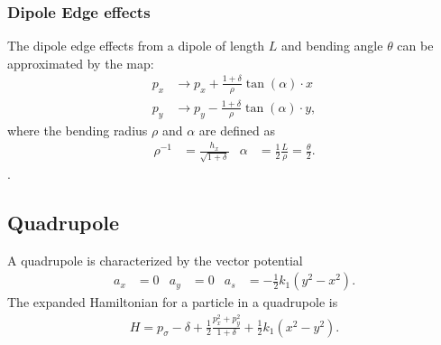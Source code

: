 \documentclass[english]{article}
\begin{document}
\subsubsection{Dipole Edge effects}
The dipole edge effects from a dipole of length $L$ and bending
angle $\theta$ can be approximated by the map:
\begin{align}
    p_x &\to p_x + \frac{1+\delta}{\rho} \tan(\alpha) \cdot x \\
    p_y &\to p_y - \frac{1+\delta}{\rho} \tan(\alpha) \cdot y,
\end{align}
where the bending radius $\rho$ and $\alpha$ are defined as
\begin{align}
    \rho^{-1}   &= \frac{h_x}{\sqrt{1+\delta}} &
    \alpha &= \frac{1}{2} \frac{L}{\rho} = \frac{\theta}{2}.
\end{align}.


\subsection{Quadrupole}

A quadrupole is characterized by the vector potential
\begin{align}
  a_x & = 0  & a_y & = 0 & a_s & = -\frac{1}{2}k_1(y^2 - x^2).
\end{align}
The expanded Hamiltonian for a particle in a quadrupole is
\begin{align}
  H =  p_\sigma -\delta + \frac{1}{2}\frac{p_x^2+p_y^2}{1+\delta}        %
  + \frac{1}{2}k_1(x^2 - y^2).
\end{align}
\end{document}
